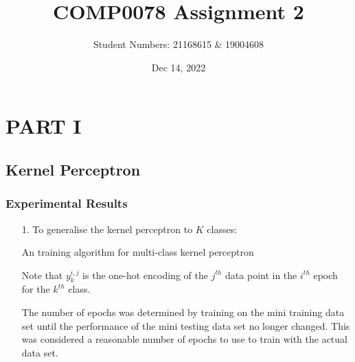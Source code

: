 \documentclass[12pt]{article}
\title{\textbf{COMP0078 Assignment 2}}
\author{Student Numbers: 21168615 \& 19004608 \\ }
\date{Dec 14, 2022}
\begin{document}
    \maketitle
\section{PART I}
\subsection{Kernel Perceptron}
\subsubsection{Experimental Results}

\begin{itemize}
    \item[1.] To generalise the kernel perceptron to $K$ classes:
    \begin{algorithm}
    \caption{An training algorithm for multi-class kernel perceptron}\label{alg:cap}
    \begin{algorithmic}
    $ \Comment Initialise weights for first training example
        \State $w^{1, 1}_k $
    \EndFor

    \For{$i\in\{1, 2, ..., M\}$}: \Comment Number of Epochs
        \If{i==1$} \Comment Skip first data point if it's the first epoch
            \State $j_{init} $
        \Else
            \State $j_{init} $
        \EndIf
        \For{$j\in\{j_{init}, ..., N\}}$ \Comment Number of training points
            $ \Comment Number of classes
                \State $_k^{i, j} \gets  \sum_{i'=1}^{i-1} \sum_{j'=1}^{j-1} ( w^{i', j'}_k \cdot  k(\textbf{x}_{j'}, \textbf{x}_j)} )$ \Comment{Prediction for class $k$ with kernel $k(\cdot, \cdot)$}
                \If{$sign(\hat{y}_k^{i, j}) \neq sign(y_k^{i, j})$} \Comment Compare predicted $\hat{y}_k^{i, j}$ and actual $y_k^{i, j})$
                    \State $w^{i, j}_{k} \gets y_k^{i, j}$
                \Else
                    \State $w^{i, j}_{k} \gets 0$
                \EndIf
            \EndFor
        \EndFor
    \EndFor
    \end{algorithmic}
    \end{algorithm}

        Note that $y_k^{i, j}$ is the one-hot encoding of the $j^{th}$ data point in the $i^{th}$ epoch for the $k^{th}$ class.

    The number of epochs was determined by training on the mini training data set until the performance of the mini testing data set no longer changed.
    This was considered a reasonable number of epochs to use to train with the actual data set.


\end{itemize}
\end{document}
